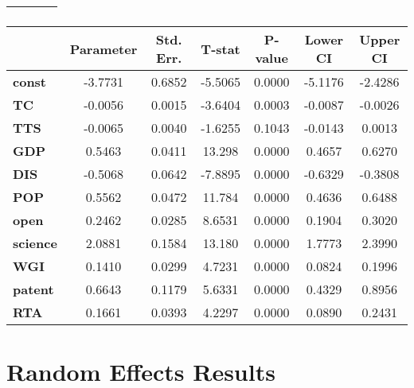 \documentclass{article}
\begin{document}
\begin{center}
\begin{tabular}{lclc}
\textbf{}                  &                    & \textbf{                     }   &                  \\
\bottomrule
\end{tabular}
\begin{tabular}{lcccccc}
                 & \textbf{Parameter} & \textbf{Std. Err.} & \textbf{T-stat} & \textbf{P-value} & \textbf{Lower CI} & \textbf{Upper CI}  \\
\midrule
\textbf{const}   &      -3.7731       &       0.6852       &     -5.5065     &      0.0000      &      -5.1176      &      -2.4286       \\
\textbf{TC}      &      -0.0056       &       0.0015       &     -3.6404     &      0.0003      &      -0.0087      &      -0.0026       \\
\textbf{TTS}     &      -0.0065       &       0.0040       &     -1.6255     &      0.1043      &      -0.0143      &       0.0013       \\
\textbf{GDP}     &       0.5463       &       0.0411       &      13.298     &      0.0000      &       0.4657      &       0.6270       \\
\textbf{DIS}     &      -0.5068       &       0.0642       &     -7.8895     &      0.0000      &      -0.6329      &      -0.3808       \\
\textbf{POP}     &       0.5562       &       0.0472       &      11.784     &      0.0000      &       0.4636      &       0.6488       \\
\textbf{open}    &       0.2462       &       0.0285       &      8.6531     &      0.0000      &       0.1904      &       0.3020       \\
\textbf{science} &       2.0881       &       0.1584       &      13.180     &      0.0000      &       1.7773      &       2.3990       \\
\textbf{WGI}     &       0.1410       &       0.0299       &      4.7231     &      0.0000      &       0.0824      &       0.1996       \\
\textbf{patent}  &       0.6643       &       0.1179       &      5.6331     &      0.0000      &       0.4329      &       0.8956       \\
\textbf{RTA}     &       0.1661       &       0.0393       &      4.2297     &      0.0000      &       0.0890      &       0.2431       \\
\bottomrule
\end{tabular}
\end{center}\section*{Random Effects Results}
\end{document}
